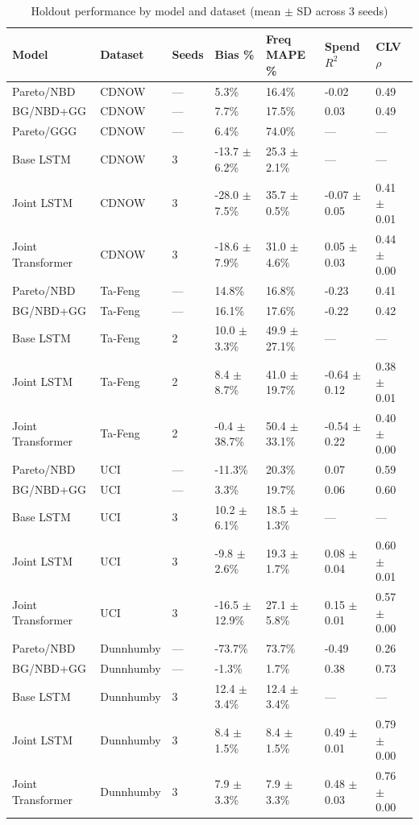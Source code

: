 \begin{table}
\caption{Holdout performance by model and dataset (mean $\pm$ SD across 3 seeds)}
\label{tab:model_comparison_aggregated}
\begin{tabular}{lllllll}
\toprule
Model & Dataset & Seeds & Bias \% & Freq MAPE \% & Spend $R^2$ & CLV $\rho$ \\
\midrule
Pareto/NBD & CDNOW & — & 5.3\% & 16.4\% & -0.02 & 0.49 \\
BG/NBD+GG & CDNOW & — & 7.7\% & 17.5\% & 0.03 & 0.49 \\
Pareto/GGG & CDNOW & — & 6.4\% & 74.0\% & — & — \\
Base LSTM & CDNOW & 3 & -13.7 $\pm$ 6.2\% & 25.3 $\pm$ 2.1\% & — & — \\
Joint LSTM & CDNOW & 3 & -28.0 $\pm$ 7.5\% & 35.7 $\pm$ 0.5\% & -0.07 $\pm$ 0.05 & 0.41 $\pm$ 0.01 \\
Joint Transformer & CDNOW & 3 & -18.6 $\pm$ 7.9\% & 31.0 $\pm$ 4.6\% & 0.05 $\pm$ 0.03 & 0.44 $\pm$ 0.00 \\
Pareto/NBD & Ta-Feng & — & 14.8\% & 16.8\% & -0.23 & 0.41 \\
BG/NBD+GG & Ta-Feng & — & 16.1\% & 17.6\% & -0.22 & 0.42 \\
Base LSTM & Ta-Feng & 2 & 10.0 $\pm$ 3.3\% & 49.9 $\pm$ 27.1\% & — & — \\
Joint LSTM & Ta-Feng & 2 & 8.4 $\pm$ 8.7\% & 41.0 $\pm$ 19.7\% & -0.64 $\pm$ 0.12 & 0.38 $\pm$ 0.01 \\
Joint Transformer & Ta-Feng & 2 & -0.4 $\pm$ 38.7\% & 50.4 $\pm$ 33.1\% & -0.54 $\pm$ 0.22 & 0.40 $\pm$ 0.00 \\
Pareto/NBD & UCI & — & -11.3\% & 20.3\% & 0.07 & 0.59 \\
BG/NBD+GG & UCI & — & 3.3\% & 19.7\% & 0.06 & 0.60 \\
Base LSTM & UCI & 3 & 10.2 $\pm$ 6.1\% & 18.5 $\pm$ 1.3\% & — & — \\
Joint LSTM & UCI & 3 & -9.8 $\pm$ 2.6\% & 19.3 $\pm$ 1.7\% & 0.08 $\pm$ 0.04 & 0.60 $\pm$ 0.01 \\
Joint Transformer & UCI & 3 & -16.5 $\pm$ 12.9\% & 27.1 $\pm$ 5.8\% & 0.15 $\pm$ 0.01 & 0.57 $\pm$ 0.00 \\
Pareto/NBD & Dunnhumby & — & -73.7\% & 73.7\% & -0.49 & 0.26 \\
BG/NBD+GG & Dunnhumby & — & -1.3\% & 1.7\% & 0.38 & 0.73 \\
Base LSTM & Dunnhumby & 3 & 12.4 $\pm$ 3.4\% & 12.4 $\pm$ 3.4\% & — & — \\
Joint LSTM & Dunnhumby & 3 & 8.4 $\pm$ 1.5\% & 8.4 $\pm$ 1.5\% & 0.49 $\pm$ 0.01 & 0.79 $\pm$ 0.00 \\
Joint Transformer & Dunnhumby & 3 & 7.9 $\pm$ 3.3\% & 7.9 $\pm$ 3.3\% & 0.48 $\pm$ 0.03 & 0.76 $\pm$ 0.00 \\
\bottomrule
\end{tabular}
\end{table}
